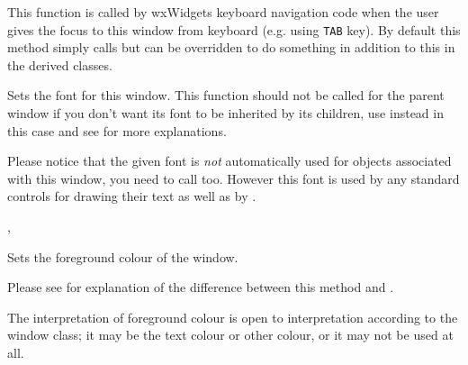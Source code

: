 This function is called by wxWidgets keyboard navigation code when the user
gives the focus to this window from keyboard (e.g. using {\tt TAB} key).
By default this method simply calls  but
can be overridden to do something in addition to this in the derived classes.


\label{wxwindowsetfont}


Sets the font for this window. This function should not be called for the
parent window if you don't want its font to be inherited by its children,
use  instead in this case and
see  for more
explanations.

Please notice that the given font is \emph{not} automatically used for 
 objects associated with this window, you need to
call  too. However this font is used by
any standard controls for drawing their text as well as by 
.




,\\


\label{wxwindowsetforegroundcolour}


Sets the foreground colour of the window.

Please see  for
explanation of the difference between this method and
.




The interpretation of foreground colour is open to interpretation according
to the window class; it may be the text colour or other colour, or it may not
be used at all.

